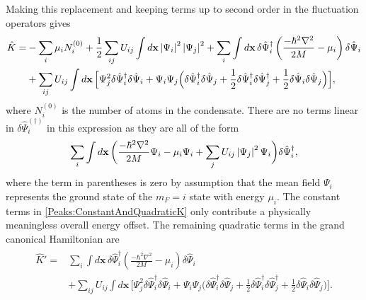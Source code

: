 Making this replacement and keeping terms up to second order in the fluctuation operators gives
\begin{align}
    \begin{split}
        \hat{K} =& -\sum_i \mu_i N_i^{(0)} + \frac{1}{2}\sum_{i j}U_{i j}\int d\mathbf{x} \abs{\Psi_i}^2\abs{\Psi_j}^2 + \sum_i \int d\mathbf{x}\, \delta\hat{\Psi}_i^\dagger \left( \frac{-\hbar^2 \nabla^2}{2M} - \mu_i\right)\delta\hat{\Psi}_i\\
        &+ \sum_{i j} U_{i j} \int d\mathbf{x}\, \Big[\Psi_j^2\delta\hat{\Psi}_i^\dagger \delta\hat{\Psi}_i + \Psi_i\Psi_j\Big(\delta\hat{\Psi}_i^\dagger \delta\hat{\Psi}_j + \frac{1}{2} \delta\hat{\Psi}_i^\dagger \delta\hat{\Psi}_j^\dagger + \frac{1}{2}\delta\hat{\Psi}_i \delta\hat{\Psi}_j \Big)\Big], \label{Peaks:ConstantAndQuadraticK}
    \end{split}
\end{align}
where $N_i^{(0)}$ is the number of atoms in the condensate. There are no terms linear in $\delta\hat{\Psi}_i^{(\dagger)}$ in this expression as they are all of the form
\begin{align}
    \sum_i \int d\mathbf{x}\,  \bigg( \frac{-\hbar^2 \nabla^2}{2M}\Psi_i - \mu_i\Psi_i + \sum_j U_{i j} \left|\Psi_j\right|^2\Psi_i\bigg) \delta \hat{\Psi}_i^\dagger,
\end{align}
where the term in parentheses is zero by assumption that the mean field $\Psi_i$ represents the ground state of the $m_F=i$ state with energy $\mu_i$. The constant terms in \eqref{Peaks:ConstantAndQuadraticK} only contribute a physically meaningless overall energy offset. The remaining quadratic terms in the grand canonical Hamiltonian are
\begin{align}
    \begin{split}
        \hat{K}' =& \sum_i \int d\mathbf{x}\, \delta\hat{\Psi}_i^\dagger \left( \frac{-\hbar^2 \nabla^2}{2M} - \mu_i\right)\delta\hat{\Psi}_i\\
        &+ \sum_{i j} U_{i j} \int d\mathbf{x}\, \Big[\Psi_j^2\delta\hat{\Psi}_i^\dagger \delta\hat{\Psi}_i + \Psi_i\Psi_j\Big(\delta\hat{\Psi}_i^\dagger \delta\hat{\Psi}_j +\frac{1}{2} \delta\hat{\Psi}_i^\dagger \delta\hat{\Psi}_j^\dagger +  \frac{1}{2}\delta\hat{\Psi}_i \delta\hat{\Psi}_j \Big)\Big].
    \end{split}
    \label{Peaks:QuadraticK}
\end{align}

